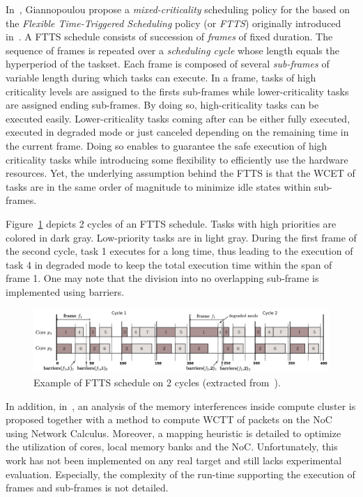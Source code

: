 \documentclass[main.tex]{subfiles}
\begin{document}
In~\cite{Giannopoulou2015}, Giannopoulou \etal propose a \emph{mixed-criticality} scheduling policy for the \mppalong based on the \emph{Flexible Time-Triggered Scheduling} policy (or \emph{FTTS}) originally introduced in~\cite{Giannopoulou2013_EMSOFT}. A FTTS schedule consists of succession of \emph{frames} of fixed duration. The sequence of frames is repeated over a \emph{scheduling cycle} whose length equals the hyperperiod of the taskset. Each frame is composed of several \emph{sub-frames} of variable length during which tasks can execute. In a frame, tasks of high criticality levels are assigned to the firsts sub-frames while lower-criticality tasks are assigned ending sub-frames. By doing so, high-criticality tasks can be executed easily. Lower-criticality tasks coming after can be either fully executed, executed in degraded mode or just canceled depending on the remaining time in the current frame. Doing so enables to guarantee the safe execution of high criticality tasks while introducing some flexibility to efficiently use the hardware resources. Yet, the underlying assumption behind the FTTS is that the WCET of tasks are in the same order of magnitude to minimize idle states within sub-frames.

\begin{example}
    Figure~\ref{fig_stateOfTheArt_2_FTTS} depicts 2 cycles of an FTTS schedule. Tasks with high priorities are colored in dark gray. Low-priority tasks are in light gray. During the first frame of the second cycle, task 1 executes for a long time, thus leading to the execution of task 4 in degraded mode to keep the total execution time within the span of frame 1. One may note that the division into no overlapping sub-frame is implemented using barriers.

\begin{figure}
    \centering
    \includegraphics[width=15cm]{imgs/png/stateOfTheArt_2_FTTS.png}
    \caption{Example of FTTS schedule on 2 cycles (extracted from~\cite{Giannopoulou2015}).}
    \label{fig_stateOfTheArt_2_FTTS}
\end{figure}
\end{example}

In addition, in~\cite{Giannopoulou2015}, an analysis of the memory interferences inside compute cluster is proposed together with a method to compute WCTT of packets on the NoC using Network Calculus. Moreover, a mapping heuristic is detailed to optimize the utilization of cores, local memory banks and the NoC. Unfortunately, this work has not been implemented on any real target and still lacks experimental evaluation. Especially, the complexity of the run-time supporting the execution of frames and sub-frames is not detailed. \\
\end{document}
